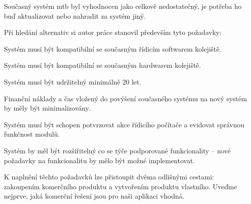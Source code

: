 Současný systém \gls{mtb} byl vyhodnocen jako celkově nedostatečný, je potřeba
ho buď aktualizovat nebo nahradit za systém jiný.

Při hledání alternativ si autor práce stanovil především tyto požadavky:

\begin{compactenum}
\item Systém musí být kompatibilní se současným řídicím softwarem kolejiště.
\item Systém musí být kompatibilní se současným hardwarem kolejiště.
\item Systém musí být udržitelný minimálně 20 let.
\item Finanční náklady a čas vložený do povýšení současného systému na nový
	systém by měly být minimalizovány.
\item Systém musí být schopen potvrzovat akce řídicího počítače a evidovat správnou
	funkčnost modulů.
\item Systém by měl být rozšiřitelný co se týče podporované funkcionality –
	nové požadavky na funkcionalitu by mělo být možné implementovat.
\end{compactenum}

K naplnění těchto požadavků lze přistoupit dvěma odlišnými cestami: zakoupením
komerčního produktu a vytvořením produktu vlastního. Uveďme nejprve, jaká komerční
řešení jsou pro naši aplikaci vhodná.

